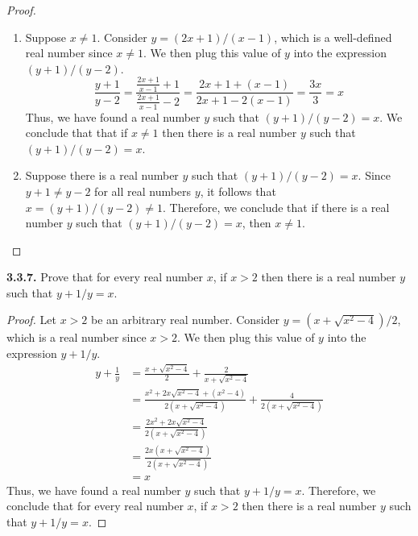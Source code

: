 \documentclass[12pt]{amsart}
\newenvironment{statement}[1]{\smallskip\noindent\color[rgb]{.6627, .3529, .6314} {\bf #1.}}{}
\theoremstyle{definition}
\theoremstyle{remark}
\begin{document}
\begin{proof}
\hfill
\begin{enumerate}
	\item Suppose $x \neq 1$.
	Consider $y = (2x + 1)/(x - 1)$, which is a well-defined real number since $x \neq 1$.
	We then plug this value of $y$ into the expression $(y + 1)/(y - 2)$.
	\begin{equation*}
		\frac{y + 1}{y - 2}
		= \frac{\frac{2x + 1}{x - 1} + 1}{\frac{2x + 1}{x - 1} - 2}
		= \frac{2x + 1 + (x - 1)}{2x + 1 - 2(x - 1)}
		= \frac{3x}{3}
		= x
	\end{equation*}
	Thus, we have found a real number $y$ such that $(y + 1)/(y - 2) = x$.
	We conclude that that if $x \neq 1$ then there is a real number 
	$y$ such that $(y + 1)/(y - 2) = x$.
	
	\item Suppose there is a real number $y$ such that $(y + 1)/(y - 2) = x$.
	Since $y + 1 \neq y - 2$ for all real numbers $y$, it follows that $x = (y + 1)/(y - 2) \neq 1$.
	Therefore, we conclude that if there is a real number $y$ such that 
	$(y + 1)/(y - 2) = x$, then $x \neq 1$.
\end{enumerate}
\end{proof}


\begin{statement}{3.3.7}
Prove that for every real number $x$, if $x > 2$ then there is a real number $y$ such that $y + 1/y = x$.
\end{statement}

\begin{proof}
Let $x > 2$ be an arbitrary real number.
Consider $y = (x + \sqrt{x^2 - 4})/2$, which is a real number since $x > 2$.
We then plug this value of $y$ into the expression $y + 1/y$.
\begin{align*}
	y + \frac{1}{y}
	&= \frac{x + \sqrt{x^2 - 4}}{2} + \frac{2}{x + \sqrt{x^2 - 4}} \\
	&= \frac{x^2 + 2x\sqrt{x^2 - 4} + (x^2 - 4)}{2(x + \sqrt{x^2 - 4})}
		+ \frac{4}{2(x + \sqrt{x^2 - 4})} \\
	&= \frac{2x^2 + 2x\sqrt{x^2 - 4}}{2(x + \sqrt{x^2 - 4})} \\
	&= \frac{2x(x + \sqrt{x^2 - 4})}{2(x + \sqrt{x^2 - 4})} \\
	&= x
\end{align*}
Thus, we have found a real number $y$ such that $y + 1/y = x$.
Therefore, we conclude that for every real number $x$, if $x > 2$ then there is a real number $y$ such that $y + 1/y = x$.
\end{proof}
\end{document}

